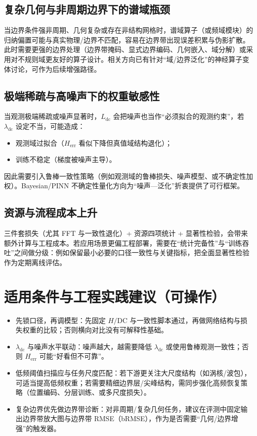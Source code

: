 \subsection{复杂几何与非周期边界下的谱域瓶颈}

当边界条件强非周期、几何复杂或存在非结构网格时，谱域算子（或频域模块）的归纳偏置可能与真实物理/边界不匹配，容易在边界带出现误差积累与伪影扩散。此时需要更强的边界处理（边界带掩码、显式边界编码、几何嵌入、域分解）或采用对不规则域更友好的算子设计。相关方向已有针对“域/边界泛化”的神经算子变体讨论，可作为后续增强路径。

\subsection{极端稀疏与高噪声下的权重敏感性}

当观测极端稀疏或噪声显著时，\( L_{\text{dc}} \) 会把噪声也当作“必须拟合的观测约束”，若 \( \lambda_{\text{dc}} \) 设定不当，可能造成：
\begin{itemize}
    \item 观测域过拟合（\( H_{\text{err}} \) 看似下降但真值域结构退化）；
    \item 训练不稳定（梯度被噪声主导）。
\end{itemize}

因此需要引入鲁棒一致性策略（例如观测域的鲁棒损失、噪声模型、或不确定性加权）。Bayesian/PINN 不确定性量化方向为“噪声—泛化”折衷提供了可行框架。

\subsection{资源与流程成本上升}

三件套损失（尤其 FFT 与一致性退化）+ 资源四项统计 + 显著性检验，会带来额外计算与工程成本。若应用场景更偏工程部署，需要在“统计完备性”与“训练吞吐”之间做分级：例如保留最小必要的口径一致性与关键指标，把全面显著性检验作为定期离线评估。

\section{适用条件与工程实践建议（可操作）}

\begin{itemize}
    \item 先锁口径，再调模型：先固定 \( H/\mathrm{DC} \) 与一致性脚本通过，再做网络结构与损失权重的比较；否则横向对比没有可解释性基础。
    \item \( \lambda_{\text{dc}} \) 与噪声水平联动：噪声越大，越需要降低 \( \lambda_{\text{dc}} \) 或使用鲁棒观测一致性；否则 \( H_{\text{err}} \) 可能“好看但不可靠”。
    \item 低频阈值扫描应与任务尺度匹配：若下游更关注大尺度结构（如涡核/波包），可适当提高低频权重；若需要精细边界层/尖峰结构，需同步强化高频恢复策略（位置编码、分层训练、或多尺度损失）。
    \item 复杂边界优先做边界带诊断：对非周期/复杂几何任务，建议在评测中固定输出边界带放大图与边界带 RMSE（bRMSE），作为是否需要“几何/边界增强”的触发器。
\end{itemize}

